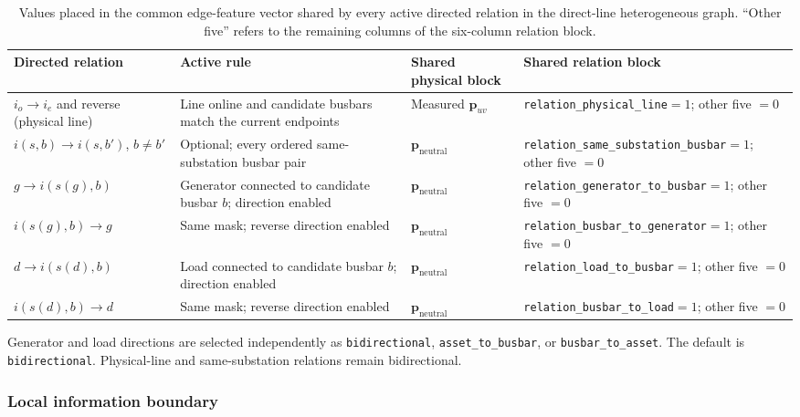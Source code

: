 \begin{table}[H]
  \centering
  \scriptsize
  \caption{Values placed in the common edge-feature vector shared by every
  active directed relation in the direct-line heterogeneous graph. ``Other
  five'' refers to the remaining columns of the six-column relation block.}
  \label{tab:heterogeneous-edge-features}
  \setlength{\tabcolsep}{3pt}
  \begin{tabular}{L{0.20\textwidth}L{0.25\textwidth}L{0.17\textwidth}L{0.29\textwidth}}
    \toprule
    Directed relation & Active rule & Shared physical block & Shared relation block \\
    \midrule
    $i_o\rightarrow i_e$ and reverse (physical line) & Line online and candidate busbars match the current endpoints & Measured $\mathbf{p}_{uv}$ & \texttt{relation\_physical\_line}$=1$; other five $=0$ \\
    $i(s,b)\rightarrow i(s,b')$, $b\neq b'$ & Optional; every ordered same-substation busbar pair & $\mathbf{p}_{\mathrm{neutral}}$ & \texttt{relation\_same\_substation\_busbar}$=1$; other five $=0$ \\
    $g\rightarrow i(s(g),b)$ & Generator connected to candidate busbar $b$; direction enabled & $\mathbf{p}_{\mathrm{neutral}}$ & \texttt{relation\_generator\_to\_busbar}$=1$; other five $=0$ \\
    $i(s(g),b)\rightarrow g$ & Same mask; reverse direction enabled & $\mathbf{p}_{\mathrm{neutral}}$ & \texttt{relation\_busbar\_to\_generator}$=1$; other five $=0$ \\
    $d\rightarrow i(s(d),b)$ & Load connected to candidate busbar $b$; direction enabled & $\mathbf{p}_{\mathrm{neutral}}$ & \texttt{relation\_load\_to\_busbar}$=1$; other five $=0$ \\
    $i(s(d),b)\rightarrow d$ & Same mask; reverse direction enabled & $\mathbf{p}_{\mathrm{neutral}}$ & \texttt{relation\_busbar\_to\_load}$=1$; other five $=0$ \\
    \bottomrule
  \end{tabular}
\end{table}

\noindent Generator and load directions are selected independently as \texttt{bidirectional},
\texttt{asset\_to\_busbar}, or \texttt{busbar\_to\_asset}. The default is
\texttt{bidirectional}. Physical-line and
same-substation relations remain bidirectional.

\subsubsection{Local information boundary}

